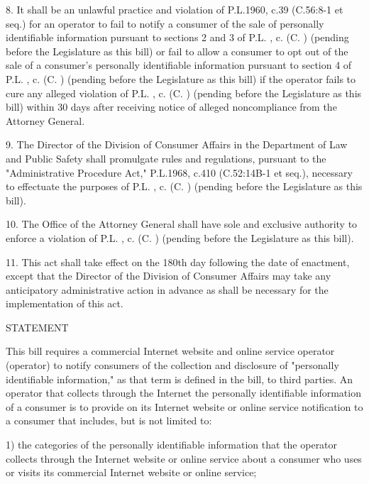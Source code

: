  

     8.    It shall be an unlawful practice and violation of P.L.1960, c.39 (C.56:8-1 et seq.) for an operator to fail to notify a consumer of the sale of personally identifiable information pursuant to sections 2 and 3 of P.L.    , c.    (C.      ) (pending before the Legislature as this bill) or fail to allow a consumer to opt out of the sale of a consumer's personally identifiable information pursuant to section 4 of P.L.    , c.    (C.      ) (pending before the Legislature as this bill) if the operator fails to cure any alleged violation of P.L.    , c.    (C.      ) (pending before the Legislature as this bill) within 30 days after receiving notice of alleged noncompliance from the Attorney General.

 

     9.    The Director of the Division of Consumer Affairs in the Department of Law and Public Safety shall promulgate rules and regulations, pursuant to the "Administrative Procedure Act,"  P.L.1968, c.410 (C.52:14B-1 et seq.), necessary to effectuate the purposes of P.L.    , c.    (C.      ) (pending before the Legislature as this bill).

 

     10.  The Office of the Attorney General shall have sole and exclusive authority to enforce a violation of P.L.    , c.    (C.      ) (pending before the Legislature as this bill).

 

     11.  This act shall take effect on the 180th day following the date of enactment, except that the Director of the Division of Consumer Affairs may take any anticipatory administrative action in advance as shall be necessary for the implementation of this act.

 

 

STATEMENT

 

     This bill requires a commercial Internet website and online service operator (operator) to notify consumers of the collection and disclosure of "personally identifiable information," as that term is defined in the bill, to third parties. An operator that collects through the Internet the personally identifiable information of a consumer is to provide on its Internet website or online service notification to a consumer that includes, but is not limited to:

     1)    the categories of the personally identifiable information that the operator collects through the Internet website or online service about a consumer who uses or visits its commercial Internet website or online service;

